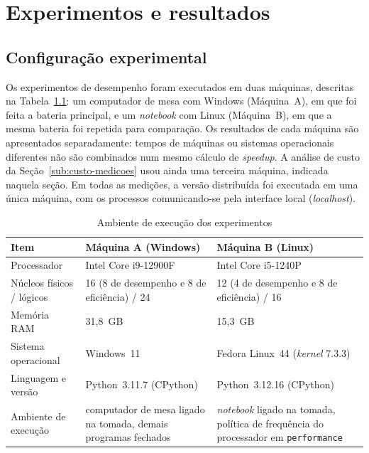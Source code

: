 
\chapter{Experimentos e resultados}\label{cap:experimentos}

\section{Configuração experimental}

Os experimentos de desempenho foram executados em duas máquinas, descritas na Tabela~\ref{tab:ambiente}: um computador de mesa com Windows (Máquina~A), em que foi feita a bateria principal, e um \textit{notebook} com Linux (Máquina~B), em que a mesma bateria foi repetida para comparação. Os resultados de cada máquina são apresentados separadamente: tempos de máquinas ou sistemas operacionais diferentes não são combinados num mesmo cálculo de \textit{speedup}. A análise de custo da Seção~\ref{sub:custo-medicoes} usou ainda uma terceira máquina, indicada naquela seção. Em todas as medições, a versão distribuída foi executada em uma única máquina, com os processos comunicando-se pela interface local (\textit{localhost}).

\begin{table}[htb]
    \centering
    \caption{Ambiente de execução dos experimentos}
    \label{tab:ambiente}
    \begin{tabular}{lp{5cm}p{5cm}}
        \toprule
        \textbf{Item} & \textbf{Máquina A (Windows)} & \textbf{Máquina B (Linux)} \\
        \midrule
        Processador & Intel Core i9-12900F & Intel Core i5-1240P \\
        Núcleos físicos / lógicos & 16 (8 de desempenho e 8 de eficiência) / 24 & 12 (4 de desempenho e 8 de eficiência) / 16 \\
        Memória RAM & 31,8~GB & 15,3~GB \\
        Sistema operacional & Windows~11 & Fedora Linux~44 (\textit{kernel} 7.3.3) \\
        Linguagem e versão & Python~3.11.7 (CPython) & Python~3.12.16 (CPython) \\
        Ambiente de execução & computador de mesa ligado na tomada, demais programas fechados & \textit{notebook} ligado na tomada, política de frequência do processador em \texttt{performance} \\
        \bottomrule
    \end{tabular}
    \fonte{}%
\end{table}

